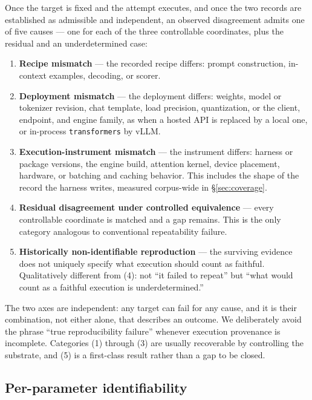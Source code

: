 Once the target is fixed and the attempt executes, and once the two records are established as admissible and independent, an observed disagreement admits one of five causes --- one for each of the three controllable coordinates, plus the residual and an underdetermined case:

\begin{enumerate}[nosep,leftmargin=1.6em]
  \item \textbf{Recipe mismatch} --- the recorded recipe differs: prompt construction, in-context examples, decoding, or scorer.
  \item \textbf{Deployment mismatch} --- the deployment differs: weights, model or tokenizer revision, chat template, load precision, quantization, or the client, endpoint, and engine family, as when a hosted API is replaced by a local one, or in-process \texttt{transformers} by vLLM.
  \item \textbf{Execution-instrument mismatch} --- the instrument differs: harness or package versions, the engine build, attention kernel, device placement, hardware, or batching and caching behavior. This includes the shape of the record the harness writes, measured corpus-wide in \S\ref{sec:coverage}.
  \item \textbf{Residual disagreement under controlled equivalence} --- every controllable coordinate is matched and a gap remains. This is the only category analogous to conventional repeatability failure.
  \item \textbf{Historically non-identifiable reproduction} --- the surviving evidence does not uniquely specify what execution should count as faithful. Qualitatively different from (4): not ``it failed to repeat'' but ``what would count as a faithful execution is underdetermined.''
\end{enumerate}

The two axes are independent: any target can fail for any cause, and it is their combination, not either alone, that describes an outcome. We deliberately avoid the phrase ``true reproducibility failure'' whenever execution provenance is incomplete. Categories (1) through (3) are usually recoverable by controlling the substrate, and (5) is a first-class result rather than a gap to be closed.

\subsection{Per-parameter identifiability}
\label{sec:identifiability}

